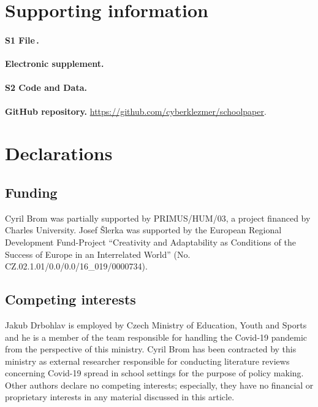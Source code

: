 \documentclass[fleqn,10pt]{wlscirep}
\def\supfile{S1 File\,}
\def\suppcode{S2 Code and Data}
\begin{document}
\section*{Supporting information}

\paragraph*{\supfile .}
{\bf Electronic supplement.} 

\paragraph*{\suppcode .}
{\bf GitHub repository.} \url{https://github.com/cyberklezmer/schoolpaper}.

\section*{Declarations}

\subsection*{Funding} 

Cyril Brom was partially supported by PRIMUS/HUM/03, a project financed by Charles University. Josef \v Slerka was supported by the European Regional Development Fund-Project “Creativity and Adaptability as Conditions of the Success of 
Europe in an Interrelated World” (No. CZ.02.1.01/0.0/0.0/16\_019/0000734).

\subsection*{Competing interests}

Jakub Drbohlav is employed by Czech Ministry of Education, Youth and Sports and he is a member of the team responsible for handling the Covid-19 pandemic from the perspective of this ministry. Cyril Brom has been contracted by this ministry as external researcher responsible for conducting literature reviews concerning Covid-19 spread in school settings for the purpose of policy making. Other authors declare no competing interests; especially, they have no financial or proprietary interests in any material discussed in this article.

\end{document}
